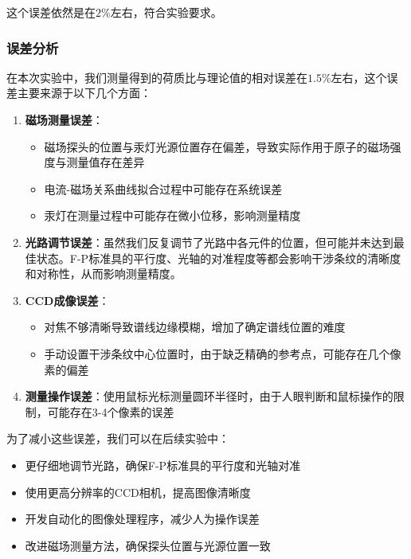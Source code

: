 \documentclass[12pt,a4paper,UTF8]{ctexart}
\begin{document}
这个误差依然是在$2\%$左右，符合实验要求。

\subsubsection*{误差分析}
在本次实验中，我们测量得到的荷质比与理论值的相对误差在$1.5\%$左右，这个误差主要来源于以下几个方面：

\begin{enumerate}
  \item \textbf{磁场测量误差}：
  \begin{itemize}
      \item 磁场探头的位置与汞灯光源位置存在偏差，导致实际作用于原子的磁场强度与测量值存在差异
      \item 电流-磁场关系曲线拟合过程中可能存在系统误差
      \item 汞灯在测量过程中可能存在微小位移，影响测量精度
  \end{itemize}

  \item \textbf{光路调节误差}：虽然我们反复调节了光路中各元件的位置，但可能并未达到最佳状态。F-P标准具的平行度、光轴的对准程度等都会影响干涉条纹的清晰度和对称性，从而影响测量精度。
    
  \item \textbf{CCD成像误差}：
  \begin{itemize}
    \item 对焦不够清晰导致谱线边缘模糊，增加了确定谱线位置的难度
    \item 手动设置干涉条纹中心位置时，由于缺乏精确的参考点，可能存在几个像素的偏差
  \end{itemize}
    
  \item \textbf{测量操作误差}：使用鼠标光标测量圆环半径时，由于人眼判断和鼠标操作的限制，可能存在3-4个像素的误差
\end{enumerate}

为了减小这些误差，我们可以在后续实验中：

\begin{itemize}
    \item 更仔细地调节光路，确保F-P标准具的平行度和光轴对准
    \item 使用更高分辨率的CCD相机，提高图像清晰度
    \item 开发自动化的图像处理程序，减少人为操作误差
    \item 改进磁场测量方法，确保探头位置与光源位置一致
\end{itemize}
\end{document}
